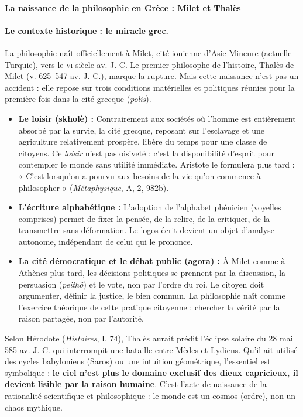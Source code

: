 \documentclass[11pt]{article}
\newcommand{\cle}[1]{{\popxbold\color{popdark}#1}}
\newcounter{popsec}
\newcounter{popsub}
\newcommand{\courssub}[1]{%
  \stepcounter{popsub}%
  \par\vspace{9pt}\noindent{\popxbold\fontsize{11.5}{13}\selectfont\color{popink}{\color{poporange}\thepopsec.\thepopsub}\hspace{6pt}#1}\par\nopagebreak\vspace{4pt}
}
\begin{document}
\courssub{Origine et objet de la philosophie}

\paragraph{La naissance de la philosophie en Grèce : Milet et Thalès}

\paragraph{Le contexte historique : le miracle grec.}
La philosophie naît officiellement à \cle{Milet}, cité ionienne d'Asie Mineure (actuelle Turquie), vers le \textsc{vi} siècle av. J.-C. Le premier philosophe de l'histoire, \cle{Thalès de Milet} (v. 625--547 av. J.-C.), marque la rupture. Mais cette naissance n'est pas un accident : elle repose sur trois conditions matérielles et politiques réunies pour la première fois dans la \cle{cité grecque} (\emph{polis}).

\begin{itemize}
    \item \textbf{Le loisir (\cle{skholè}) :} Contrairement aux sociétés où l'homme est entièrement absorbé par la survie, la cité grecque, reposant sur l'esclavage et une agriculture relativement prospère, libère du temps pour une classe de citoyens. Ce \emph{loisir} n'est pas oisiveté : c'est la disponibilité d'esprit pour contempler le monde sans utilité immédiate. \cle{Aristote} le formulera plus tard : « C'est lorsqu'on a pourvu aux besoins de la vie qu'on commence à philosopher » (\emph{Métaphysique}, A, 2, 982b).
    \item \textbf{L'écriture alphabétique :} L'adoption de l'alphabet phénicien (voyelles comprises) permet de fixer la pensée, de la relire, de la critiquer, de la transmettre sans déformation. Le \cle{logos} écrit devient un objet d'analyse autonome, indépendant de celui qui le prononce.
    \item \textbf{La cité démocratique et le débat public (\cle{agora}) :} À Milet comme à Athènes plus tard, les décisions politiques se prennent par la discussion, la persuasion (\emph{peithô}) et le vote, non par l'ordre du roi. Le citoyen doit argumenter, définir la justice, le bien commun. La philosophie naît comme l'exercice théorique de cette pratique citoyenne : chercher la vérité par la raison partagée, non par l'autorité.
\end{itemize}

\begin{savaistu}
Selon Hérodote (\emph{Histoires}, I, 74), Thalès aurait prédit l'éclipse solaire du 28 mai 585 av. J.-C. qui interrompit une bataille entre Mèdes et Lydiens. Qu'il ait utilisé des cycles babyloniens (Saros) ou une intuition géométrique, l'essentiel est symbolique : \textbf{le ciel n'est plus le domaine exclusif des dieux capricieux, il devient lisible par la raison humaine}. C'est l'acte de naissance de la \cle{rationalité scientifique} et philosophique : le monde est un \cle{cosmos} (ordre), non un \cle{chaos} mythique.
\end{savaistu}
\end{document}
